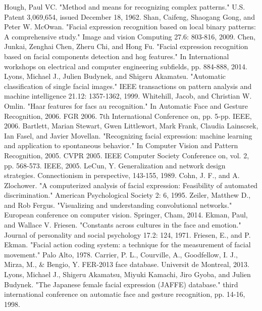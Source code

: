 \documentclass[conference]{IEEEtran}
\begin{document}
\begin{thebibliography}{1}
Hough, Paul VC. "Method and means for recognizing complex patterns." U.S. Patent 3,069,654, issued December 18, 1962.
Shan, Caifeng, Shaogang Gong, and Peter W. McOwan. "Facial expression recognition based on local binary patterns: A comprehensive study." Image and vision Computing 27.6: 803-816, 2009.
Chen, Junkai, Zenghai Chen, Zheru Chi, and Hong Fu. "Facial expression recognition based on facial components detection and hog features." In International workshops on electrical and computer engineering subfields, pp. 884-888, 2014.
Lyons, Michael J., Julien Budynek, and Shigeru Akamatsu. "Automatic classification of single facial images." IEEE transactions on pattern analysis and machine intelligence 21.12: 1357-1362, 1999.
Whitehill, Jacob, and Christian W. Omlin. "Haar features for facs au recognition." In Automatic Face and Gesture Recognition, 2006. FGR 2006. 7th International Conference on, pp. 5-pp. IEEE, 2006.
Bartlett, Marian Stewart, Gwen Littlewort, Mark Frank, Claudia Lainscsek, Ian Fasel, and Javier Movellan. "Recognizing facial expression: machine learning and application to spontaneous behavior." In Computer Vision and Pattern Recognition, 2005. CVPR 2005. IEEE Computer Society Conference on, vol. 2, pp. 568-573. IEEE, 2005.
LeCun, Y. Generalization and network design strategies. Connectionism in perspective, 143-155, 1989.
Cohn, J. F., and A. Zlochower. "A computerized analysis of facial expression: Feasibility of automated discrimination." American Psychological Society 2: 6, 1995.
Zeiler, Matthew D., and Rob Fergus. "Visualizing and understanding convolutional networks." European conference on computer vision. Springer, Cham, 2014.
Ekman, Paul, and Wallace V. Friesen. "Constants across cultures in the face and emotion." Journal of personality and social psychology 17.2: 124, 1971.
Friesen, E., and P. Ekman. "Facial action coding system: a technique for the measurement of facial movement." Palo Alto, 1978.
Carrier, P. L., Courville, A., Goodfellow, I. J., Mirza, M., \& Bengio, Y. FER-2013 face database. Universit de Montreal, 2013.
Lyons, Michael J., Shigeru Akamatsu, Miyuki Kamachi, Jiro Gyoba, and Julien Budynek. "The Japanese female facial expression (JAFFE) database."  third international conference on automatic face and gesture recognition, pp. 14-16, 1998.

\end{thebibliography}
\end{document}
